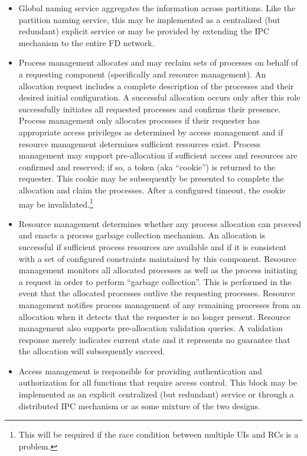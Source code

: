 \begin{itemize}
\item Global naming service aggregates the  information across partitions.  Like the partition naming service, this may be implemented as a centralized (but redundant) explicit service or may be provided by extending the IPC  mechanism to the entire FD  network.

\item Process management allocates and may reclaim sets of processes on behalf of a requesting component (specifically  and resource management). 
  An allocation request includes a complete description of the processes and their desired initial configuration. 
  A successful allocation occurs only after this role successfully initiates all requested processes and confirms their presence. 
  Process management only allocates processes if their requester has appropriate access privileges as determined by access management and if resource management determines sufficient resources exist. 
  Process management may support pre-allocation if sufficient access and resources are confirmed and reserved; if so, a token (aka ``cookie'') is returned to the requester. 
  This cookie may be subsequently be presented to complete the allocation and claim the processes. 
  After a configured timeout, the cookie may be invalidated.\footnote{This will be required if the race condition between multiple UIs and RCs is a problem.}  
  
\item Resource management determines whether any process allocation can proceed and enacts a process garbage collection mechanism. 
  An allocation is successful if sufficient process resources are available and if it is consistent with a set of configured constraints maintained by this component. 
  Resource management monitors all allocated processes as well as the process initiating a request in order to perform ``garbage collection''. 
  This is performed in the event that the allocated processes outlive the requesting processes.
  Resource management  notifies process management of any remaining processes from an allocation when it detects that the requester is no longer present.
  Resource management also supports pre-allocation validation queries. 
  A validation response merely indicates current state and it represents no guarantee that the allocation will subsequently succeed.

  
\item Access management is responsible for providing authentication and authorization for all  functions that require access control. 
  This block may be implemented as an explicit centralized (but redundant) service or through a distributed IPC mechanism or as some mixture of the two designs. 

\end{itemize}

